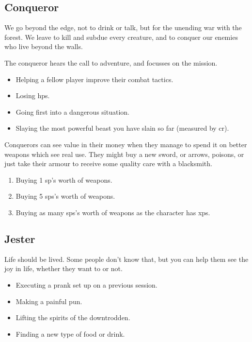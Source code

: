 \begin{multicols}{2}
\null

\subsection{Conqueror}
\label{conqueror}

We go beyond the \gls{edge}, not to drink or talk, but for the unending war with the forest.
We leave to kill and subdue every creature, and to conquer our enemies who live beyond the walls.

The conqueror hears the call to adventure, and focusses on the mission.

\begin{itemize}

  \item
  Helping a fellow player improve their combat tactics.
  \item
  Losing \glspl{hp}.
  \item
  Going first into a dangerous situation.
  \item
  Slaying the most powerful beast you have slain so far (measured by \gls{cr}).

\end{itemize}

Conquerors can see value in their money when they manage to spend it on better weapons which see real use.
They might buy a new sword, or arrows, poisons, or just take their armour to receive some quality care with a blacksmith.

\begin{enumerate}
  \item
  Buying 1 \gls{sp}'s worth of weapons.
  \item
  Buying 5 \glspl{sp}'s worth of weapons.
  \item
  Buying as many \glspl{sp}'s worth of weapons as the character has \glspl{xp}.
\end{enumerate}

\subsection{Jester}
\label{jester}

Life should be lived.
Some people don't know that, but you can help them see the joy in life, whether they want to or not.

\begin{itemize}
  \item
  Executing a prank set up on a previous session.
  \item
  Making a painful pun.
  \item
  Lifting the spirits of the downtrodden.
  \item
  Finding a new type of food or drink.
\end{itemize}


\end{multicols}
